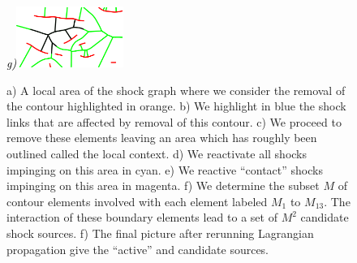 \begin{appendices}
\begin{figure}[!ht]
{\footnotesize\textit{\textcolor{black}{g)}}}\includegraphics[width=0.31\textwidth]{figs/giraffe_after_shocks.pdf}

\caption{a) A local area of the shock graph where we consider the removal of the contour highlighted in orange. b) We highlight in blue the shock links that are affected by removal of this contour. c) We proceed to remove these elements leaving an area which has roughly been outlined called the local context. d) We reactivate all shocks impinging on this area in cyan. e) We reactive ``contact'' shocks impinging on this area in magenta. f) We determine the subset $M$ of contour elements involved with each element labeled $M_1$ to $M_13$. The interaction of these boundary elements lead to a set of $M^2$ candidate shock sources. f) The final picture after rerunning Lagrangian propagation give the ``active'' and candidate sources. } 
\label{fig:loop_step}
\end{figure}


\end{appendices}
